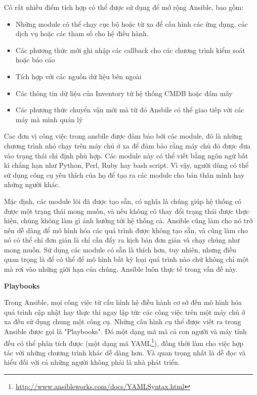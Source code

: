 Có rất nhiều điểm tích hợp có thể được sử dụng để mở rộng Ansible, bao gồm:

\begin{itemize}
\item Những module có thể chạy cục bộ hoặc từ xa để cấu hình các ứng dụng, các dịch vụ hoặc các tham số cho hệ điều hành.
\item Các phương thức mới ghi nhập các callback cho các chương trình kiểm soát hoặc báo cáo
\item Tích hợp với các nguồn dữ liệu bên ngoài
\item Các thông tin dữ liệu của Inventory từ hệ thống CMDB hoặc đám mây
\item Các phương thức chuyển vận mới mà từ đó Ansbile có thể giao tiếp với các máy mà mình quản lý
\end{itemize}

Cac đơn vị công việc trong ansbile được đảm bảo bởi các module, đó là những chương trình nhỏ chạy trên máy chủ ở xa để đảm bảo rằng máy chủ đó được đưa vào trạng thái chỉ định phù hợp. Các module này có thể viết bằng ngôn ngữ bất kì chẳng hạn như Python, Perl, Ruby hay bash script. Vì vậy, người dùng có thể sử dụng công cụ yêu thích của họ để tạo ra các module cho bản thân mình hay những người khác.

Mặc định, các module lõi đã được tạo sẵn, có nghĩa là chúng giúp hệ thống có được một trạng thái mong muốn, và nếu không có thay đổi trạng thái được thực hiện, chúng không làm gì ảnh hưởng tới hệ thống cả. Ansible cũng làm cho nó trở nên dễ dàng để mô hình hóa các quá trình được không tạo sẵn, và cũng làm cho nó có thể chỉ đơn giản là chỉ cần đẩy ra kịch bản đơn giản và chạy chúng như mong muốn. Sử dụng các module có sẵn là thích hơn, tuy nhiên, nhưng điều quan trọng là để có thể để mô hình bất kỳ loại quá trình nào chứ không chỉ một mà rơi vào những giới hạn của chúng. Ansible luôn thực tế trong vấn đề này.


\textbf{\large Playbooks}


Trong Ansible, mọi công việc từ cấu hình hệ điều hành cơ sở đến mô hình hóa quá trình cập nhật hay thực thi ngay lập tức các công việc trên một máy chủ ở xa đều sử dụng chung một công cụ. Những cấu hình cụ thể được viết ra trong Ansible được gọi là "Playbooks". Đó một dạng mã mà cả con người và máy tính đều có thể phân tích được (một dạng mã YAML\footnote{\url{http://www.ansibleworks.com/docs/YAMLSyntax.html}}), đồng thời làm cho việc hợp tác với những chương trình khác dễ dàng hơn. Và quan trọng nhất là dễ đọc và hiểu đối với cả những người không phải là nhà phát triển.

